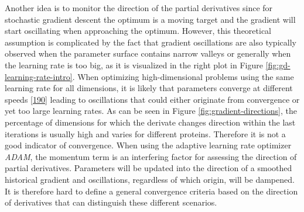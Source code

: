 \documentclass[11pt,a4paper,twoside]{book}
\theoremstyle{definition}
\theoremstyle{definition}
\theoremstyle{remark}
\begin{document}
Another idea is to monitor the direction of the partial derivatives
since for stochastic gradient descent the optimum is a moving target and
the gradient will start oscillating when approaching the optimum.
However, this theoretical assumption is complicated by the fact that
gradient oscillations are also typically observed when the parameter
surface contains narrow valleys or generally when the learning rate is
too big, as it is visualized in the right plot in Figure
\ref{fig:gd-learning-rate-intro}. When optimizing high-dimensional
problems using the same learning rate for all dimensions, it is likely
that parameters converge at different speeds
{[}\protect\hyperlink{ref-Ruder2017}{190}{]} leading to oscillations
that could either originate from convergence or yet too large learning
rates. As can be seen in Figure \ref{fig:gradient-directions}, the
percentage of dimensions for which the derivate changes direction within
the last iterations is usually high and varies for different proteins.
Therefore it is not a good indicator of convergence. When using the
adaptive learning rate optimizer \emph{ADAM}, the momentum term is an
interfering factor for assessing the direction of partial derivatives.
Parameters will be updated into the direction of a smoothed historical
gradient and oscillations, regardless of which origin, will be dampened.
It is therefore hard to define a general convergence criteria based on
the direction of derivatives that can distinguish these different
scenarios.
\end{document}
